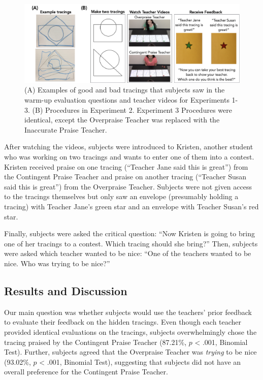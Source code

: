 \documentclass[10pt, letterpaper]{article}
\newenvironment{CodeChunk}{}{}
\begin{document}
\begin{CodeChunk}
\begin{figure}[h]

{\centering \includegraphics{figs/image-1} 

}

\caption[(A) Examples of good and bad tracings that subjects saw in the warm-up evaluation questions and teacher videos for Experiments 1-3]{(A) Examples of good and bad tracings that subjects saw in the warm-up evaluation questions and teacher videos for Experiments 1-3. (B) Procedures in Experiment 2. Experiment 3 Procedures were identical, except the Overpraise Teacher was replaced with the Inaccurate Praise Teacher.}\label{fig:image}
\end{figure}
\end{CodeChunk}

After watching the videos, subjects were introduced to Kristen, another
student who was working on two tracings and wants to enter one of them
into a contest. Kristen received praise on one tracing (``Teacher Jane
said this is great'') from the Contingent Praise Teacher and praise on
another tracing (``Teacher Susan said this is great'') from the
Overpraise Teacher. Subjects were not given access to the tracings
themselves but only saw an envelope (presumably holding a tracing) with
Teacher Jane's green star and an envelope with Teacher Susan's red star.

Finally, subjects were asked the critical question: ``Now Kristen is
going to bring one of her tracings to a contest. Which tracing should
she bring?'' Then, subjects were asked which teacher wanted to be nice:
``One of the teachers wanted to be nice. Who was trying to be nice?''

\subsection{Results and Discussion}\label{results-and-discussion}

Our main question was whether subjects would use the teachers' prior
feedback to evaluate their feedback on the hidden tracings. Even though
each teacher provided identical evaluations on the tracings, subjects
overwhelmingly chose the tracing praised by the Contingent Praise
Teacher (87.21\%, \(p\) \textless{} .001, Binomial Test). Further,
subjects agreed that the Overpraise Teacher was \emph{trying} to be nice
(93.02\%, \(p\) \textless{} .001, Binomial Test), suggesting that
subjects did not have an overall preference for the Contingent Praise
Teacher.
\end{document}
